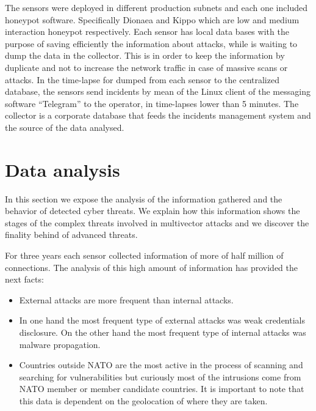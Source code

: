 \documentclass[a4paper]{llncs}
\begin{document}
The sensors were deployed in different production subnets and each one included honeypot software. Specifically Dionaea\cite{dionaea} and Kippo\cite{kippo} which are low and medium interaction honeypot respectively. Each sensor has local data bases with the purpose of saving efficiently the information about attacks, while is waiting to dump the data in the collector. This is  in order to keep the information by duplicate and not to increase the network traffic in case of massive scans or attacks. In the time-lapse for dumped from each sensor to the centralized database, the sensors send incidents by mean of the Linux client of the messaging software ``Telegram'' to the operator, in time-lapses lower than 5 minutes. The collector is a corporate database that feeds the incidents management system and the source of the data analysed.
	
	
\section{Data analysis}
\label{sec:analysis}
In this section we expose the analysis of the information gathered and the behavior of detected cyber threats. We explain how this information shows the stages of the complex threats involved in multivector attacks and we discover the finality behind of advanced threats.

For three years each sensor collected information of more of half million of connections. The analysis of this high amount of information has provided the next facts:
\begin{itemize}
	\item External attacks are more frequent than internal attacks.
	\item In one hand the most frequent type of external attacks was weak credentials disclosure. On the other hand the most frequent type of internal attacks was malware propagation.
	\item Countries outside NATO are the most active in the process of scanning and searching for vulnerabilities but curiously most of the intrusions come from NATO member or member candidate countries. It is important to note that this data is dependent on the geolocation of where they are taken.
\end{itemize}
	
\end{document}
